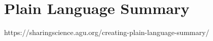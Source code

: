 \documentclass[draft]{agujournal2019}
\begin{document}
\section{Plain Language Summary}
https://sharingscience.agu.org/creating-plain-language-summary/



%
%

%


%
%
%
%
\end{document}
